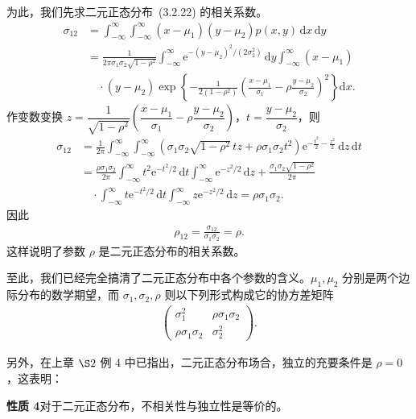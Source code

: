 \documentclass[../../main.tex]{subfiles}
\begin{document}
为此，我们先求二元正态分布~(3.2.22) 的相关系数。
\begin{align*}
\sigma_{12}&=\int_{-\infty}^{\infty}\int_{-\infty}^{\infty}(x-\mu_1)(y-\mu_2)p(x,y)\,\mathrm{d}x\,\mathrm{d}y\\
&=\frac{1}{2\pi\sigma_1\sigma_2\sqrt{1-\rho^2}}\int_{-\infty}^{\infty}\mathrm{e}^{-(y-\mu_2)^2/(2\sigma_2^2)}\,\mathrm{d}y
\int_{-\infty}^{\infty}(x-\mu_1)\\
&\quad\cdot(y-\mu_2)\exp\left\{-\frac{1}{2(1-\rho^2)}\left(\frac{x-\mu_1}{\sigma_1}-\rho\frac{y-\mu_2}{\sigma_2}\right)^2\right\}\mathrm{d}x.
\end{align*}
作变数变换 $z=\dfrac{1}{\sqrt{1-\rho^2}}\left(\dfrac{x-\mu_1}{\sigma_1}-\rho\dfrac{y-\mu_2}{\sigma_2}\right)$，$t=\dfrac{y-\mu_2}{\sigma_2}$，则
\begin{align*}
\sigma_{12}
&=\frac{1}{2\pi}\int_{-\infty}^{\infty}\int_{-\infty}^{\infty}(\sigma_1\sigma_2\sqrt{1-\rho^2}\,tz+\rho\sigma_1\sigma_2 t^2)\mathrm{e}^{-\frac{t^2}{2}-\frac{z^2}{2}}\,\mathrm{d}z\,\mathrm{d}t\\
&=\frac{\rho\sigma_1\sigma_2}{2\pi}\int_{-\infty}^{\infty}t^2\mathrm{e}^{-t^2/2}\,\mathrm{d}t\int_{-\infty}^{\infty}\mathrm{e}^{-z^2/2}\,\mathrm{d}z
+\frac{\sigma_1\sigma_2\sqrt{1-\rho^2}}{2\pi}\\
&\quad\cdot\int_{-\infty}^{\infty}t\mathrm{e}^{-t^2/2}\,\mathrm{d}t\int_{-\infty}^{\infty}z\mathrm{e}^{-z^2/2}\,\mathrm{d}z=\rho\sigma_1\sigma_2.
\end{align*}
因此
\begin{align}
\rho_{12}=\frac{\sigma_{12}}{\sigma_1\sigma_2}=\rho.\label{align:ch04-二元正态相关系数}
\end{align}
这样说明了参数 $\rho$ 是二元正态分布的相关系数。

至此，我们已经完全搞清了二元正态分布中各个参数的含义。$\mu_1,\mu_2$ 分别是两个边际分布的数学期望，而 $\sigma_1,\sigma_2,\rho$ 则以下列形式构成它的协方差矩阵
\begin{align}
\begin{pmatrix}
\sigma_1^2&\rho\sigma_1\sigma_2\\
\rho\sigma_1\sigma_2&\sigma_2^2
\end{pmatrix}.\label{align:ch04-二元正态协方差矩阵}
\end{align}

另外，在上章 $\S 2$ 例 4 中已指出，二元正态分布场合，独立的充要条件是 $\rho=0$，这表明：

\noindent\textbf{性质 4}\quad 对于二元正态分布，不相关性与独立性是等价的。
\end{document}
